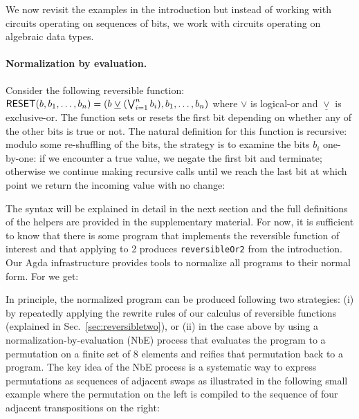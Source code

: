 We now revisit the examples in the introduction but instead of working with circuits operating on sequences of bits, we
work with circuits operating on algebraic data types.

\paragraph*{Normalization by evaluation.} Consider the following reversible function:
$\Afun{RESET}(b,b_1,\ldots,b_n) = (b \; \underline{\vee} \; (\bigvee_{i=1}^n b_i),b_1,\ldots,b_n)$ where $\vee$ is
logical-or and $\underline{\vee}$ is exclusive-or. The function sets or resets the first bit depending on whether any of
the other bits is true or not. The natural definition for this function is recursive: modulo some re-shuffling of the
bits, the strategy is to examine the bits $b_i$ one-by-one: if we encounter a true value, we negate the first bit and
terminate; otherwise we continue making recursive calls until we reach the last bit at which point we return the
incoming value with no change:


\resettwo{}

\noindent The syntax will be explained in detail in the next section and the full definitions of the helpers are
provided in the supplementary material. For now, it is sufficient to know that there is some program that implements the
reversible function of interest and that applying  to 2 produces \verb|reversibleOr2| from the
introduction. Our Agda infrastructure provides tools to normalize all programs to their normal form. For 
we get:

\resetnormtwo{}

In principle, the normalized program can be produced following two strategies: (i) by repeatedly applying the rewrite
rules of our calculus of reversible functions (explained in Sec.~\ref{sec:reversibletwo}), or (ii) in the case above by
using a normalization-by-evaluation (NbE) process that evaluates the program to a permutation on a finite set of 8
elements and reifies that permutation back to a program. The key idea of the NbE process is a systematic way to express
permutations as sequences of adjacent swaps as illustrated in the following small example where the permutation on the
left is compiled to the sequence of four adjacent transpositions on the right:

